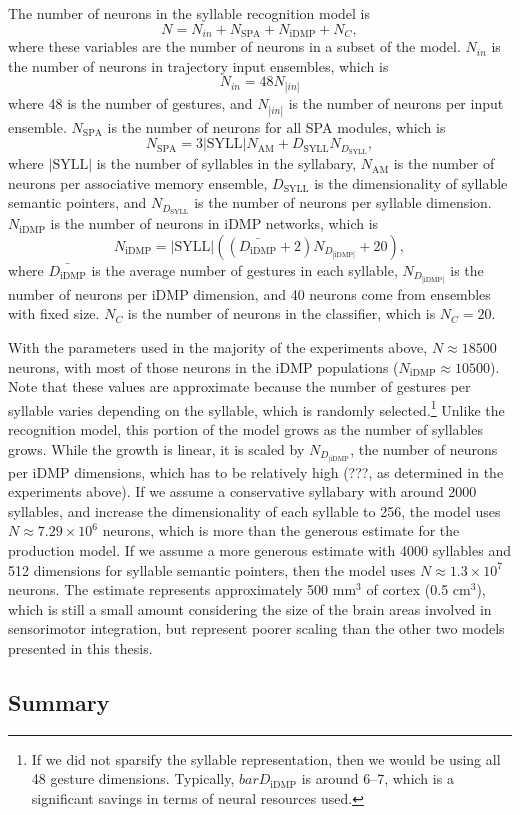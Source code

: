The number of neurons in the
syllable recognition model is
\begin{equation}
  N = N_{in} + N_{\text{SPA}} + N_{\text{iDMP}} + N_C,
\end{equation}
where these variables
are the number of neurons in
a subset of the model.
$N_{in}$ is the number of neurons
in trajectory input ensembles, which is
\begin{equation}
  N_{in} = 48 N_{|in|}
\end{equation}
where 48 is the number of gestures,
and $N_{|in|}$ is the number of neurons
per input ensemble.
$N_{\text{SPA}}$ is the number of
neurons for all SPA modules,
which is
\begin{equation}
  N_{\text{SPA}} = 3 |\text{SYLL}| N_{\text{AM}}
    + D_{\text{SYLL}} N_D_{\text{SYLL}},
\end{equation}
where $|\text{SYLL}|$ is the number of
syllables in the syllabary,
$N_{\text{AM}}$ is the number of neurons
per associative memory ensemble,
$D_{\text{SYLL}}$ is the dimensionality
of syllable semantic pointers,
and $N_D_{\text{SYLL}}$ is the number of neurons
per syllable dimension.
$N_{\text{iDMP}}$ is the number of neurons
in iDMP networks, which is
\begin{equation}
  N_{\text{iDMP}} = |\text{SYLL}| \left( \left(\bar{D_{\text{iDMP}}} + 2 \right)
    N_D_{|\text{iDMP}|} + 20 \right),
\end{equation}
where $\bar{D_{\text{iDMP}}}$ is the average
number of gestures in each syllable,
$N_D_{|\text{iDMP}|}$ is the number of neurons
per iDMP dimension,
and 40 neurons come from ensembles with fixed size.
$N_C$ is the number of neurons
in the classifier,
which is $N_C = 20$.

With the parameters used
in the majority of the experiments above,
$N\approx18500$ neurons,
with most of those neurons
in the iDMP populations
($N_{\text{iDMP}}\approx10500$).
Note that these values are approximate
because the number of gestures per syllable
varies depending on the syllable,
which is randomly selected.\footnote{
  If we did not sparsify the syllable representation,
  then we would be using all 48 gesture dimensions.
  Typically, $bar{D_{\text{iDMP}}}$ is around 6--7,
  which is a significant savings in terms
  of neural resources used.}
Unlike the recognition model,
this portion of the model
grows as the number of syllables grows.
While the growth is linear,
it is scaled by $N_D_{|\text{iDMP}}$,
the number of neurons per iDMP dimensions,
which has to be relatively high
(???, as determined in the experiments above).
If we assume a conservative syllabary
with around 2000 syllables,
and increase the dimensionality
of each syllable to 256,
the model uses
$N \approx 7.29 \times 10^6$ neurons,
which is more than the generous
estimate for the production model.
If we assume a more generous estimate
with 4000 syllables
and 512 dimensions
for syllable semantic pointers,
then the model uses
$N \approx 1.3 \times 10^7$ neurons.
The estimate represents approximately
500 mm$^3$ of cortex (0.5 cm$^3$),
which is still a small amount
considering the size of the brain areas
involved in sensorimotor integration,
but represent poorer scaling
than the other two models presented in this thesis.

\subsection{Summary}

